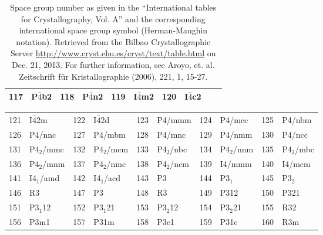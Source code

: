 \documentclass[final,12pt,makeidx,DIV=calc]{article}
\begin{document}
{{{\begin{table}[h!]
\begin{center}
\begin{tabular}{||r|l||r|l||r|l||r|l||r|l||}
117    & P$\bar{4}$b2              & 
118    & P$\bar{4}$n2              & 
119    & I$\bar{4}$m2              & 
120    & I$\bar{4}$c2              \\
\hline
\end{tabular}
\end{center}
\caption{\label{table:spacegroupnumber_a}Space group number as given
  in the ``International tables for Crystallography, Vol. A'' and the
  corresponding international space group symbol (Herman-Maughin
  notation). Retrieved from the Bilbao Crystallographic Server
  \url{http://www.cryst.ehu.es/cryst/text/table.html} on Dec. 21,
  2013.  For further information, see Aroyo, et. al. Zeitschrift f\"ur
  Kristallographie (2006), 221, 1, 15-27.  }
\end{table}


\begin{table}[!h]
\begin{center}
\begin{tabular}{||r|l||r|l||r|l||r|l||r|l||}
\hline
121    & I$\bar{4}$2m              & 
122    & I$\bar{4}$2d              & 
123    & P4/mmm             & 
124    & P4/mcc             & 
125    & P4/nbm             \\
126    & P4/nnc             & 
127    & P4/mbm             & 
128    & P4/mnc             & 
129    & P4/nmm             & 
130    & P4/ncc             \\
131    & P4$_2$/mmc         & 
132    & P4$_2$/mcm         & 
133    & P4$_2$/nbc         & 
134    & P4$_2$/nnm         & 
135    & P4$_2$/mbc         \\
136    & P4$_2$/mnm         & 
137    & P4$_2$/nmc         & 
138    & P4$_2$/ncm         & 
139    & I4/mmm             & 
140    & I4/mcm             \\
141    & I4$_1$/amd         & 
142    & I4$_1$/acd         & 
143    & P3                 & 
144    & P3$_1$             & 
145    & P3$_2$             \\
146    & R3                 & 
147    & P$\bar{3}$         & 
148    & R$\bar{3}$         & 
149    & P312               & 
150    & P321               \\
151    & P3$_1$12           & 
152    & P3$_1$21           & 
153    & P3$_2$12           & 
154    & P3$_2$21           & 
155    & R32                \\
156    & P3m1               & 
157    & P31m               & 
158    & P3c1               & 
159    & P31c               & 
160    & R3m                \\

\end{tabular}
\end{center}
\end{table}}}}
\end{document}
